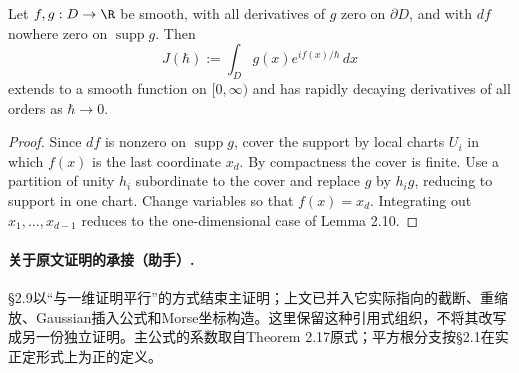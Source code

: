 \begin{lemma}[Lemma 2.21]
Let $f,g:D\to\R$ be smooth, with all derivatives of $g$ zero on $\partial D$, and with $df$ nowhere zero on $\operatorname{supp}g$. Then
\[
J(\hbar):=\int_D g(x)e^{if(x)/\hbar}\,dx
\]
extends to a smooth function on $[0,\infty)$ and has rapidly decaying derivatives of all orders as $\hbar\to0$.
\end{lemma}
\begin{proof}
Since $df$ is nonzero on $\operatorname{supp}g$, cover the support by local charts $U_i$ in which $f(x)$ is the last coordinate $x_d$. By compactness the cover is finite. Use a partition of unity $h_i$ subordinate to the cover and replace $g$ by $h_i g$, reducing to support in one chart. Change variables so that $f(x)=x_d$. Integrating out $x_1,\ldots,x_{d-1}$ reduces to the one-dimensional case of Lemma 2.10.
\end{proof}

\paragraph{关于原文证明的承接（助手）.}
§2.9以“与一维证明平行”的方式结束主证明；上文已并入它实际指向的截断、重缩放、Gaussian插入公式和Morse坐标构造。这里保留这种引用式组织，不将其改写成另一份独立证明。主公式的系数取自Theorem 2.17原式；平方根分支按§2.1在实正定形式上为正的定义。

